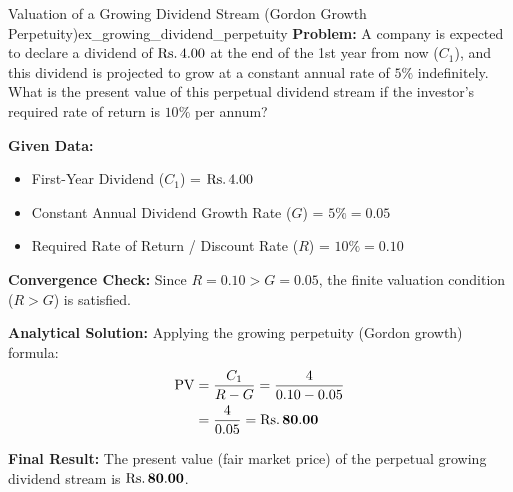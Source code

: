\begin{example}{Valuation of a Growing Dividend Stream (Gordon Growth Perpetuity)}{ex_growing_dividend_perpetuity}
\textbf{Problem:}
A company is expected to declare a dividend of $\text{Rs.}\, 4.00$ at the end of the 1st year from now ($C_1$), and this dividend is projected to grow at a constant annual rate of $5\%$ indefinitely. What is the present value of this perpetual dividend stream if the investor's required rate of return is $10\%$ per annum?

\tcbline
\textbf{Given Data:}
\begin{itemize}[noitemsep]
    \item First-Year Dividend ($C_1$) = $\text{Rs.}\, 4.00$
    \item Constant Annual Dividend Growth Rate ($G$) = $5\% = 0.05$
    \item Required Rate of Return / Discount Rate ($R$) = $10\% = 0.10$
\end{itemize}

\textbf{Convergence Check:}
Since $R = 0.10 > G = 0.05$, the finite valuation condition ($R > G$) is satisfied.

\textbf{Analytical Solution:}
Applying the growing perpetuity (Gordon growth) formula:
\begin{align*}
    \operatorname{PV} &= \frac{C_1}{R - G} = \frac{4}{0.10 - 0.05} \\
    &= \frac{4}{0.05} = \mathbf{\text{Rs.}\, 80.00}
\end{align*}

\textbf{Final Result:}
The present value (fair market price) of the perpetual growing dividend stream is $\mathbf{\text{Rs.}\, 80.00}$.
\end{example}

